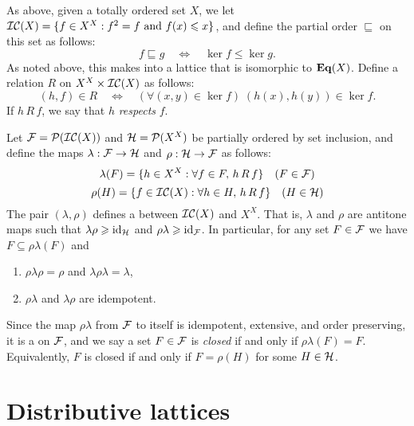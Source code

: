 As above, given a totally ordered set $X$, 
we let $\mathcal{IC}(X) = \{f\in X^X: f^2 = f \text{ and } f(x) \leqslant x\}$, and 
define the partial order $\sqsubseteq$ on this set as follows:
\[
f\sqsubseteq g \quad \Leftrightarrow \quad \ker f \leq \ker g.  
\]
As noted above, 
this makes \icx into a lattice that is isomorphic to $\mathbf{Eq}(X)$.   
Define a relation $R$ on $X^X \times \mathcal{IC}(X)$ as follows: 
\[
(h,f) \in R \quad \Leftrightarrow \quad (\forall (x,y) \in \ker f)\; (h(x),h(y))
\in \ker f.
\]
If $h\, R\, f$, we say that  $h$ \emph{respects} $f$.

Let $\mathcal{F} = \mathcal{P}(\mathcal{IC}(X))$ and $\mathcal{H} = \mathcal{P}(X^X)$ be partially ordered by set
inclusion, and define the maps 
$\lambda: \mathcal{F} \rightarrow \mathcal{H}$ and $\rho: \mathcal{H} \rightarrow \mathcal{F}$ as follows:
\[
\lambda(F) = \{h\in X^X: \forall f\in F,\, h\, R \,f\} \quad (F \in \mathcal{F})
\]
\[
\rho(H) = \{f\in \mathcal{IC}(X): \forall h\in H,\, h\, R\, f\} \quad (H \in \mathcal{H})
\]
The pair $(\lambda, \rho)$ defines a  between
$\mathcal{IC}(X)$ and $X^X$.  That is, $\lambda$ and $\rho$ are 
antitone %
maps such that $\lambda \rho \geqslant \operatorname{id}_{\mathcal{H}}$ and $\rho
\lambda \geqslant \operatorname{id}_{\mathcal{F}}$.  In particular, for any set $F \in \mathcal{F}$ we have 
$F \subseteq \rho \lambda (F)$ and
\begin{enumerate}
\item  $\rho\lambda\rho = \rho$ and $\lambda\rho \lambda= \lambda$,
\item $\rho \lambda$ and $\lambda \rho$ are idempotent.
\end{enumerate}

Since the map $\rho \lambda$ from $\mathcal{F}$ to itself is idempotent, extensive, 
and order preserving, it is a 
on $\mathcal{F}$, and we say a set $F\in \mathcal{F}$ is
\emph{closed} if and only if $\rho\lambda(F) = F$. Equivalently,
$F$ is closed if and only if $F = \rho(H)$ for some $H\in \mathcal{H}$.



\section{Distributive lattices}
\label{sec:distr-latt}

